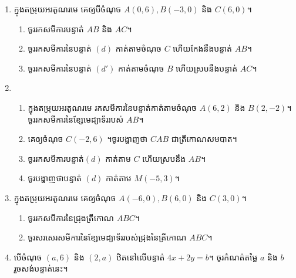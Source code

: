 \begin{enumerate}
\item  ក្នុងតម្រុយអរតូណរមេ គេឲ្យបីចំណុច $A(0,6), B(-3,0)$ និង $C(6,0)$។
\begin{enumerate}[label=\alph*.]
\item  ចូររកសមីការបន្ទាត់ $AB$ និង $AC$។
\item ចូររកសមីការនៃបន្ទាត់ $(d)$ កាត់តាមចំណុច $C$ ហើយកែងនឹងបន្ទាត់ $AB$។
\item  ចូររកសមីការនៃបន្ទាត់ $(d')$ កាត់តាមចំណុច $B$ ហើយស្របនឹងបន្ទាត់ $AC$។
\end{enumerate}

\item  
\begin{enumerate}[label=\alph*.]
\item  ក្នុងតម្រុយអរតូណរមេ រកសមីការនៃបន្ទាត់កាត់តាមចំណុច $A(6,2)$ និង $B(2,-2)$។ ចូររកសមីការនៃខ្សែមេដ្យាទ័ររបស់ $AB$។
\item គេឲ្យចំណុច $C(-2,6)$ ។ចូរបង្ហាញថា $CAB$ ជាត្រីកោណសមបាត។
\item  ចូររកសមីការបន្ទាត់$(d)$ កាត់តាម $C$ ហើយស្របនឹង $AB$។
\item  ចូរបង្ហាញថាបន្ទាត់ $(d)$ កាត់តាម  $M(-5,3)$។
\end{enumerate}

\item  ក្នុងតម្រុយអរតូណរមេ គេឲ្យចំណុច $A(-6,0), B(6,0)$ និង  $C(3,0)$។
\begin{enumerate}[label=\alph*.]
\item ចូររកសមីការនៃជ្រុងត្រីកោណ $ABC$។
\item  ចូរសរសេរសមីការនៃខ្សែមេដ្យាទ័ររបស់ជ្រុងនៃត្រីកោណ $ABC$។
\end{enumerate}

\item បើចំណុច $(a,6)$ និង $(2,a)$ ឋិតនៅលើបន្ទាត់ $4x+2y=b$។ ចូរកំណត់តម្លៃ $a$ និង $b$ រួចសង់បន្ទាត់នេះ។

\end{enumerate}


\newpage
\proa
	


